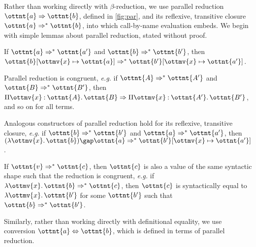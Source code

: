 \documentclass[a4paper,UKenglish,cleveref,autoref,thm-restate]{lipics-v2021}
\makeatletter
\newcommand{\eg}{\textit{e.g.}\@\xspace}
\makeatother
\begin{document}
Rather than working directly with $\beta$-reduction,
we use parallel reduction $ \ottnt{a}  \Rightarrow  \ottnt{b} $,
defined in \cref{fig:par},
and its reflexive, transitive closure $ \ottnt{a}  \Rightarrow^\ast  \ottnt{b} $,
into which call-by-name evaluation embeds.
We begin with simple lemmas about parallel reduction, stated without proof.

\begin{lemma}[Substitution (p.r.)] \label{lem:pars:subst}
  If $ \ottnt{a}  \Rightarrow^\ast  \ottnt{a'} $ and $ \ottnt{b}  \Rightarrow^\ast  \ottnt{b'} $,
  then $  \ottnt{b} [  \ottmv{x}  \mapsto  \ottnt{a}  ]   \Rightarrow^\ast   \ottnt{b'} [  \ottmv{x}  \mapsto  \ottnt{a'}  ]  $.
\end{lemma}

\begin{lemma}[Congruence (p.r.)] \label{lem:pars:cong}
  Parallel reduction is congruent,
  \eg if $ \ottnt{A}  \Rightarrow^\ast  \ottnt{A'} $ and $ \ottnt{B}  \Rightarrow^\ast  \ottnt{B'} $,
  then $  \Pi  \ottmv{x}  \mathbin{:}  \ottnt{A}  \mathpunct{.}  \ottnt{B}   \Rightarrow   \Pi  \ottmv{x}  \mathbin{:}  \ottnt{A'}  \mathpunct{.}  \ottnt{B'}  $,
  and so on for all terms.
\end{lemma}

\begin{lemma}[Construction (p.r.)] \label{lem:pars:cons}
  Analogous constructors of parallel reduction hold
  for its reflexive, transitive closure,
  \eg if $ \ottnt{b}  \Rightarrow^\ast  \ottnt{b'} $ and $ \ottnt{a}  \Rightarrow^\ast  \ottnt{a'} $,
  then $   (  \lambda  \ottmv{x}  \mathpunct{.}  \ottnt{b}  )   \gap  \ottnt{a}   \Rightarrow^\ast   \ottnt{b'} [  \ottmv{x}  \mapsto  \ottnt{a'}  ]  $.
\end{lemma}

\begin{lemma}[Inversion (p.r.)] \label{lem:pars:inv}
  If $ \ottnt{v}  \Rightarrow^\ast  \ottnt{c} $, then $\ottnt{c}$ is also a value of the same syntactic shape
  such that the reduction is congruent,
  \eg if $  \lambda  \ottmv{x}  \mathpunct{.}  \ottnt{b}   \Rightarrow^\ast  \ottnt{c} $, then $\ottnt{c}$ is syntactically equal to $ \lambda  \ottmv{x}  \mathpunct{.}  \ottnt{b'} $
  for some $\ottnt{b'}$ such that $ \ottnt{b}  \Rightarrow^\ast  \ottnt{b'} $.
\end{lemma}

Similarly, rather than working directly with definitional equality,
we use conversion $ \ottnt{a}  \Leftrightarrow  \ottnt{b} $,
which is defined in terms of parallel reduction.
\end{document}
